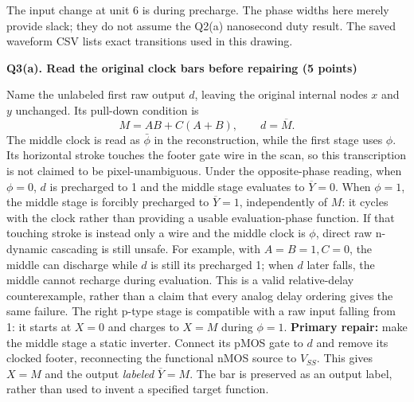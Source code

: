 \documentclass[10pt]{article}
\newcommand{\qheading}[1]{\par\medskip\textbf{#1}\par}
\begin{document}
The input change at unit 6 is during precharge. The phase widths here merely provide slack; they do not assume the Q2(a) nanosecond duty result. The saved waveform CSV lists exact transitions used in this drawing.
\qheading{Q3(a). Read the original clock bars before repairing (5 points)}
Name the unlabeled first raw output $d$, leaving the original internal nodes $x$ and $y$ unchanged. Its pull-down condition is
\[
M=AB+C(A+B),\qquad d=\overline M.
\]
The middle clock is read as $\bar\phi$ in the reconstruction, while the first stage uses $\phi$. Its horizontal stroke touches the footer gate wire in the scan, so this transcription is not claimed to be pixel-unambiguous. Under the opposite-phase reading, when $\phi=0$, $d$ is precharged to 1 and the middle stage evaluates to $\overline Y=0$. When $\phi=1$, the middle stage is forcibly precharged to $\overline Y=1$, independently of $M$: it cycles with the clock rather than providing a usable evaluation-phase function.
If that touching stroke is instead only a wire and the middle clock is $\phi$, direct raw n-dynamic cascading is still unsafe. For example, with $A=B=1,C=0$, the middle can discharge while $d$ is still its precharged 1; when $d$ later falls, the middle cannot recharge during evaluation. This is a valid relative-delay counterexample, rather than a claim that every analog delay ordering gives the same failure.
The right p-type stage is compatible with a raw input falling from 1: it starts at $X=0$ and charges to $X=M$ during $\phi=1$.
\textbf{Primary repair:} make the middle stage a static inverter. Connect its pMOS gate to $d$ and remove its clocked footer, reconnecting the functional nMOS source to $V_{SS}$. This gives $X=M$ and the output \emph{labeled} $\overline Y=M$. The bar is preserved as an output label, rather than used to invent a specified target function.
\newpage
\end{document}
